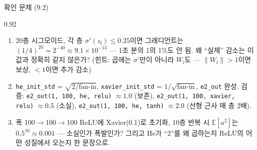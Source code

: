 \begin{frame}{확인 문제 (9.2)}
\begin{center}\begin{varwidth}{0.92\textwidth}
  \small
  \begin{enumerate}
    \item {} 20층 시그모이드, 각 층 $\sigma'(z_l) \le 0.25$이면
      그래디언트는 $(1/4)^{20} = 2^{-40} \approx 9.1 \times 10^{-13}$
      — 1조 분의 1의 1\%도 안 됨. 왜 ``실제'' 감소는 이 값과 정확히
      같지 않은가? (힌트: 곱에는 $\sigma'$만이 아니라 $W_l$도 —
      $\|W_l\| > 1$이면 보상, $< 1$이면 추가 감소)
    \item {} \texttt{he\_init\_std} = $\sqrt{2/\text{fan-in}}$,
      \texttt{xavier\_init\_std} = $1/\sqrt{\text{fan-in}}$,
      \texttt{e2\_out} 완성.
      검증: \texttt{e2\_out(1, 100, he, relu)} $\approx 1.0$ (보존),
      \texttt{e2\_out(1, 100, xavier, relu)} $\approx 0.5$ (소실),
      \texttt{e2\_out(1, 100, he, tanh)} $\approx 2.0$ (선형 근사
      매 층 2배).
    \item {} 폭 100$\to$100$\to$100 ReLU에 Xavier(0.1)로
      초기화, 10층 반복 시 $\mathbb{E}[a^2]$는 $0.5^{10} \approx 0.001$ —
      소실인가 폭발인가? 그리고 He가 ``2''를 왜 곱하는지 ReLU의
      어떤 성질에서 오는지 한 문장으로.
  \end{enumerate}
\end{varwidth}\end{center}
\end{frame}
